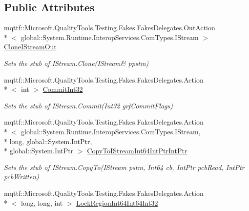 \subsection*{Public Attributes}
\begin{DoxyCompactItemize}
\item 
mqttf\-::\-Microsoft.\-Quality\-Tools.\-Testing.\-Fakes.\-Fakes\-Delegates.\-Out\-Action\\*
$<$ global\-::\-System.\-Runtime.\-Interop\-Services.\-Com\-Types.\-I\-Stream $>$ \hyperlink{class_system_1_1_runtime_1_1_interop_services_1_1_com_types_1_1_fakes_1_1_stub_i_stream_a0b0fa7a43bd2c7445b031b0bf701f727}{Clone\-I\-Stream\-Out}
\begin{DoxyCompactList}\small\item\em Sets the stub of I\-Stream.\-Clone(I\-Stream\& ppstm)\end{DoxyCompactList}\item 
mqttf\-::\-Microsoft.\-Quality\-Tools.\-Testing.\-Fakes.\-Fakes\-Delegates.\-Action\\*
$<$ int $>$ \hyperlink{class_system_1_1_runtime_1_1_interop_services_1_1_com_types_1_1_fakes_1_1_stub_i_stream_ac63b446d0a624acc3fea51723b3f157e}{Commit\-Int32}
\begin{DoxyCompactList}\small\item\em Sets the stub of I\-Stream.\-Commit(\-Int32 grf\-Commit\-Flags)\end{DoxyCompactList}\item 
mqttf\-::\-Microsoft.\-Quality\-Tools.\-Testing.\-Fakes.\-Fakes\-Delegates.\-Action\\*
$<$ global\-::\-System.\-Runtime.\-Interop\-Services.\-Com\-Types.\-I\-Stream, \\*
long, global\-::\-System.\-Int\-Ptr, \\*
global\-::\-System.\-Int\-Ptr $>$ \hyperlink{class_system_1_1_runtime_1_1_interop_services_1_1_com_types_1_1_fakes_1_1_stub_i_stream_ab4d092a0fc7b45be6488a0b4bdb66094}{Copy\-To\-I\-Stream\-Int64\-Int\-Ptr\-Int\-Ptr}
\begin{DoxyCompactList}\small\item\em Sets the stub of I\-Stream.\-Copy\-To(\-I\-Stream pstm, Int64 cb, Int\-Ptr pcb\-Read, Int\-Ptr pcb\-Written)\end{DoxyCompactList}\item 
mqttf\-::\-Microsoft.\-Quality\-Tools.\-Testing.\-Fakes.\-Fakes\-Delegates.\-Action\\*
$<$ long, long, int $>$ \hyperlink{class_system_1_1_runtime_1_1_interop_services_1_1_com_types_1_1_fakes_1_1_stub_i_stream_a9f5cc0a9fa7c3f8c31cf752211fdaf1a}{Lock\-Region\-Int64\-Int64\-Int32}

\end{DoxyCompactItemize}
